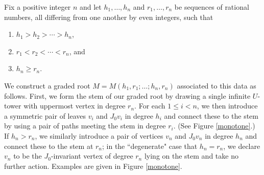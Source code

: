 \documentclass[11 pt]{amsart}
\theoremstyle{remark}
\begin{document}
Fix a positive integer $n$ and let $h_1, \ldots, h_n$ and $r_1, \ldots, r_n$ be sequences of rational numbers, all differing from one another by even integers, such that
\begin{enumerate}
\item $h_1 > h_2 > \cdots > h_n$, 
\item $r_1 < r_2 < \cdots < r_n$, and 
\item $h_n \geq r_n$.
\end{enumerate}
We construct a graded root $M = M(h_1, r_1; \ldots; h_n, r_n)$ associated to this data as follows. First, we form the stem of our graded root by drawing a single infinite $U$-tower with uppermost vertex in degree $r_n$. For each $1 \leq i < n$, we then introduce a symmetric pair of leaves $v_i$ and $J_0v_i$ in degree $h_i$ and connect these to the stem by using a pair of paths meeting the stem in degree $r_i$. (See Figure \ref{monotone}.) If $h_n > r_n$, we similarly introduce a pair of vertices $v_n$ and $J_0v_n$ in degree $h_n$ and connect these to the stem at $r_n$; in the ``degenerate" case that $h_n = r_n$, we declare $v_n$ to be the $J_0$-invariant vertex of degree $r_n$ lying on the stem and take no further action. Examples are given in Figure \ref{monotone}. 
\end{document}
